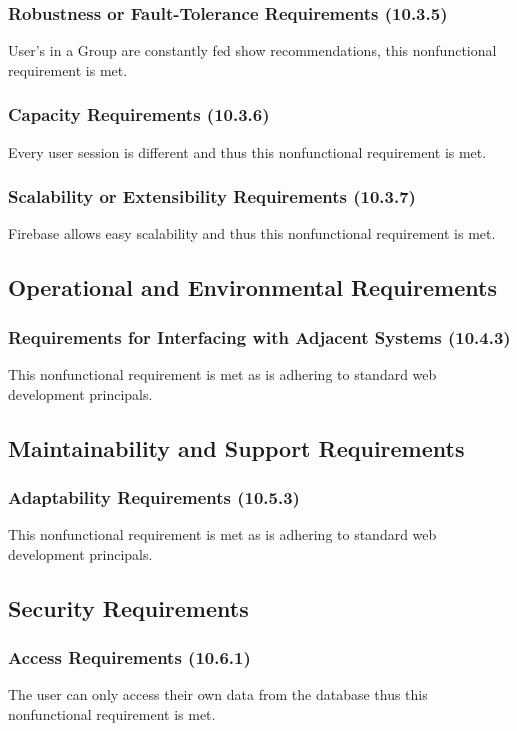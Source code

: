 \documentclass[12pt, titlepage]{article}
\begin{document}
\subsubsection{Robustness or Fault-Tolerance Requirements (10.3.5)}
User's in a Group are constantly fed show recommendations, this nonfunctional requirement is met.

\subsubsection{Capacity Requirements (10.3.6)}
Every user session is different and thus this nonfunctional requirement is met.

\subsubsection{Scalability or Extensibility Requirements (10.3.7)}
Firebase allows easy scalability and thus this nonfunctional requirement is met.

\subsection{Operational and Environmental Requirements}
\subsubsection{Requirements for Interfacing with Adjacent Systems (10.4.3)}
This nonfunctional requirement is met as \progname is adhering to standard web development principals.

\subsection{Maintainability and Support Requirements}
\subsubsection{Adaptability Requirements (10.5.3)}
This nonfunctional requirement is met as \progname is adhering to standard web development principals.

\subsection{Security Requirements}
\subsubsection{Access Requirements (10.6.1)}
The user can only access their own data from the database thus this nonfunctional requirement is met.
\end{document}
